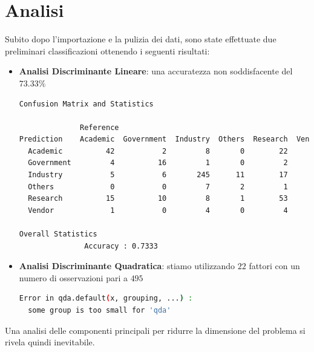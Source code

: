 \documentclass[11pt,a4paper]{article}
\begin{document}
\section{Analisi}
Subito dopo l'importazione e la pulizia dei dati, sono state effettuate due
preliminari classificazioni ottenendo i seguenti risultati:
\begin{itemize}
	\item \textbf{Analisi Discriminante Lineare}: una accuratezza non
		soddisfacente del $73.33\%$
	\begin{lstlisting}[language=bash,basicstyle=\scriptsize,tabsize=2,frame = single]
Confusion Matrix and Statistics

              Reference
Prediction    Academic  Government  Industry  Others  Research  Vendor
  Academic          42           2         8       0        22       2
  Government         4          16         1       0         2       0
  Industry           5           6       245      11        17       0
  Others             0           0         7       2         1       0
  Research          15          10         8       1        53       1
  Vendor             1           0         4       0         4       5

Overall Statistics
               Accuracy : 0.7333
	\end{lstlisting}
	\item \textbf{Analisi Discriminante Quadratica}: stiamo utilizzando $22$
		fattori con un numero di osservazioni pari a $495$
	\begin{lstlisting}[language=bash,basicstyle=\scriptsize,tabsize=2,frame = single]
Error in qda.default(x, grouping, ...) : 
  some group is too small for 'qda'
	\end{lstlisting}
\end{itemize}
Una analisi delle componenti principali per ridurre la dimensione del problema
si rivela quindi inevitabile.
\end{document}
